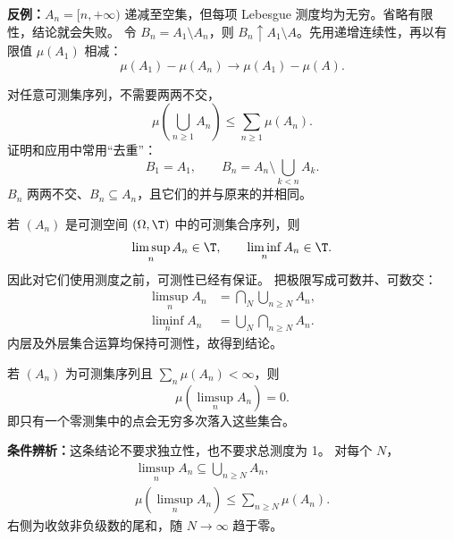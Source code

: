\textbf{反例：}$A_n=[n,+\infty)$ 递减至空集，但每项 Lebesgue 测度均为无穷。省略有限性，结论就会失败。
令 $B_n=A_1\setminus A_n$，则 $B_n\uparrow A_1\setminus A$。先用递增连续性，再以有限值 $\mu(A_1)$ 相减：
\[
\mu(A_1)-\mu(A_n)\longrightarrow\mu(A_1)-\mu(A).
\]

对任意可测集序列，不需要两两不交，
\[
\mu\left(\bigcup_{n\ge1}A_n\right)\le\sum_{n\ge1}\mu(A_n).
\]
证明和应用中常用“去重”：
\[
B_1=A_1,\qquad B_n=A_n\setminus\bigcup_{k<n}A_k.
\]
$B_n$ 两两不交、$B_n\subseteq A_n$，且它们的并与原来的并相同。

若 $(A_n)$ 是可测空间 $(\Omega,\T)$ 中的可测集合序列，则
\[
\limsup_n A_n\in\T,\qquad\liminf_n A_n\in\T.
\]
因此对它们使用测度之前，可测性已经有保证。
把极限写成可数并、可数交：
\[
\begin{aligned}
\limsup_n A_n&=\bigcap_N\bigcup_{n\ge N}A_n,\\
\liminf_n A_n&=\bigcup_N\bigcap_{n\ge N}A_n.
\end{aligned}
\]
内层及外层集合运算均保持可测性，故得到结论。

若 $(A_n)$ 为可测集序列且 $\sum_n\mu(A_n)<\infty$，则
\[
\mu(\limsup_n A_n)=0.
\]
即只有一个零测集中的点会无穷多次落入这些集合。

\textbf{条件辨析：}这条结论不要求独立性，也不要求总测度为 1。
对每个 $N$，
\[
\begin{gathered}
\limsup_n A_n\subseteq\bigcup_{n\ge N}A_n,\\
\mu(\limsup_n A_n)\le\sum_{n\ge N}\mu(A_n).
\end{gathered}
\]
右侧为收敛非负级数的尾和，随 $N\to\infty$ 趋于零。

